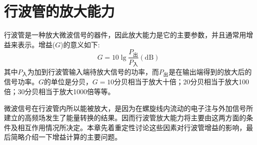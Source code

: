 \chapter{行波管的放大能力} \label{ch4}
行波管是一种放大微波信号的器件，因此放大能力是它的主要参数，并且通常用增益来表示。增益($ G $)的意义如下:
\begin{equation} \label{eq:ch4-1}
	G=10\lg\frac{P_\text{出}}{P_\text{入}}(\textrm{dB})
\end{equation}
其中$ P_\textrm{入} $为加到行波管输入端待放大信号的功率，而$ P_\text{出} $是在输出端得到的放大后的信号功率。$ G $的单位是分贝，$ G=10 $分贝相当于放大十倍；20分贝相当于放大100倍；30分贝相当于放大1000倍等等。

微波信号在行波管内所以能被放大，是因为在螺旋线内流动的电子注与外加信号所建立的高频场发生了能量转换的结果。因而行波管放大能力将主要由这两方面的条件及相互作用情况所决定。本章先着重定性讨论这些因素对行波管增益的影响，最后简略介绍一下增益计算的主要问题。
